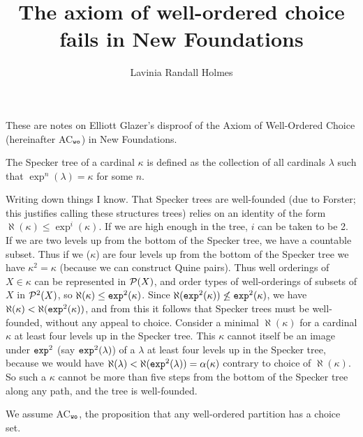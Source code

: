 \documentclass[12pt]{article}
\title{The axiom of well-ordered choice fails in New Foundations}
\author{Lavinia Randall Holmes}
\begin{document}
\maketitle

These are notes on Elliott Glazer's disproof of the Axiom of Well-Ordered Choice (hereinafter AC$_{\tt wo}$) in New Foundations.   

The Specker tree of a cardinal $\kappa$ is defined as the collection of all cardinals $\lambda$ such that $\exp^n(\lambda)= \kappa$ for some $n$.

Writing down things I know.  That Specker trees are well-founded (due to Forster;  this justifies calling these structures trees) relies on an identity of the form $\aleph(\kappa) \leq \exp^i(\kappa)$.  If we are high enough in the tree, $i$ can be taken to be 2.  If we are two levels up from the bottom of the Specker tree, we have a countable subset.  Thus if we ($\kappa$) are four levels up from the bottom of the Specker tree we have $\kappa^2=\kappa$ (because we can construct Quine pairs).  Thus well orderings of $X \in \kappa$ can be represented in ${\cal P}(X)$, and order types of well-orderings of subsets of $X$ in ${\cal P}^2(X)$, so $\aleph(\kappa) \leq {\tt exp}^2(\kappa)$.  Since $\aleph({\tt exp}^2(\kappa)) \not\leq {\tt exp}^2(\kappa)$, we have $\aleph(\kappa)<\aleph({\tt exp}^2(\kappa))$, and from this it follows that Specker trees must be well-founded, without any appeal to choice.  Consider a minimal
$\aleph(\kappa)$ for a cardinal $\kappa$ at least four levels up in the Specker tree.  This $\kappa$ cannot itself be an image
under ${\tt exp}^2$ (say ${\tt exp}^2(\lambda)$) of a $\lambda$ at least four levels up in the Specker tree, because we would have $\aleph(\lambda) < \aleph({\tt exp}^2(\lambda)) = \alpha(\kappa)$ contrary to choice of $\aleph(\kappa)$.  So such
a $\kappa$ cannot be more than five steps from the bottom of the Specker tree along any path, and the tree is well-founded.

We assume AC$_{\tt wo}$, the proposition that any well-ordered partition has a choice set.
\end{document}
